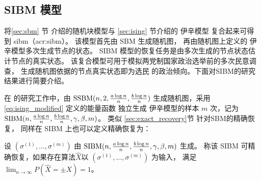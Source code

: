 \subsection{SIBM 模型}\label{sec:sibm_model}
将\ref{sec:sbm} 节 介绍的随机块模型与 \ref{sec:ising} 节介绍的 伊辛模型
复合起来可得到 \gls{sibm}（\gls{acr:sibm}）\cite{ye2020exact}。
该模型首先由 SBM 生成随机图，
再由随机图上定义的 伊辛模型多次生成节点的状态。
SIBM 模型的恢复任务是由多次生成的节点状态估计节点的真实状态。
该复合模型可用于模拟两党制国家政治选举前的多次民意调查，
生成随机图依据的节点真实状态即为选民
的政治倾向。下面对SIBM的研究结果进行简要介绍。

在\citet{ye2020exact} 的研究工作中，由 $\operatorname{SSBM}(n,2,\frac{a \log n}{n}, \frac{b \log n}{n})$
生成随机图，采用 \eqref{eq:ising_modified} 定义的能量函数
独立生成 伊辛模型的样本 $m$ 次，记为
$\operatorname{SIBM}(n, \frac{a \log n}{n}, \frac{b \log n}{n}, \gamma, \beta, m)$。
类似 \ref{sec:exact_recovery}节
针对SBM的精确恢复，
同样在 SIBM 上也可以定义精确恢复为：
\begin{definition}\label{def:sibm_exact_recovery}
  设 $(\sigma^{(1)}, \dots, \sigma^{(m)})$
  由 $\operatorname{SIBM}(n, \frac{a \log n}{n}, \frac{b \log n}{n}, \gamma, \beta, m)$ 生成。
  称该 SIBM 可精确恢复，如果存在算法$\hat{X}$以
  $(\sigma^{(1)}, \dots, \sigma^{(m)})$ 为输入，
  满足 $\lim_{n\to \infty}P(\hat{X}=\pm X) = 1$。 
\end{definition}

